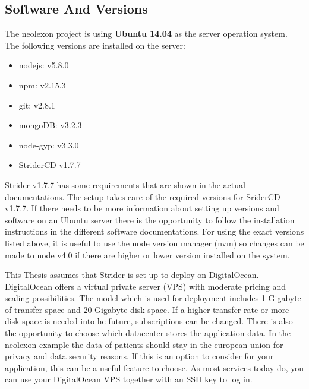 \subsection{Software And Versions}
The neolexon project is using \textbf{Ubuntu 14.04} as the server operation system. The following versions are installed on the server:
\begin{itemize}
  \item nodejs: v5.8.0
  \item npm: v2.15.3
  \item git: v2.8.1
  \item mongoDB: v3.2.3
  \item node-gyp: v3.3.0
  \item StriderCD v1.7.7
\end{itemize}

Strider v1.7.7 has some requirements that are shown in the actual documentations. The setup takes care of the required versions for SriderCD v1.7.7.
If there needs to be more information about setting up versions and software on an Ubuntu server there is the opportunity to follow the installation instructions
in the different software documentations. For using the exact versions listed above, it is useful to use the node version manager (nvm) so changes can be
made to node v4.0 if there are higher or lower version installed on the system.

This Thesis assumes that Strider is set up to deploy on DigitalOcean. DigitalOcean offers a virtual private server (VPS) with moderate pricing and scaling
possibilities. The model which is used for deployment includes 1 Gigabyte of transfer space and 20 Gigabyte disk space. If a higher transfer rate or more disk space
is needed into he future, subscriptions can be changed. There is also the opportunity to choose which datacenter stores the application data. In the neolexon example
the data of patients should stay in the european union for privacy and data security reasons. If this is an option to consider for your application, this can be a useful
feature to choose. As most services today do, you can use your DigitalOcean VPS together with an SSH key to log in.

